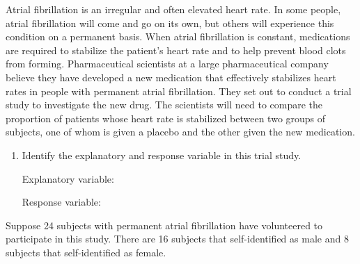 \documentclass[
]{report}
\begin{document}
Atrial fibrillation is an irregular and often elevated heart rate. In some people, atrial fibrillation will come and go on its own, but others will experience this condition on a permanent basis. When atrial fibrillation is constant, medications are required to stabilize the patient's heart rate and to help prevent blood clots from forming. Pharmaceutical scientists at a large pharmaceutical company believe they have developed a new medication that effectively stabilizes heart rates in people with permanent atrial fibrillation. They set out to conduct a trial study to investigate the new drug. The scientists will need to compare the proportion of patients whose heart rate is stabilized between two groups of subjects, one of whom is given a placebo and the other given the new medication.

\begin{enumerate}
\def\labelenumi{\arabic{enumi}.}
\item
  Identify the explanatory and response variable in this trial study.

  Explanatory variable:
  \vspace{0.5in}

  Response variable:
  \vspace{0.5in}
\end{enumerate}

\newpage

Suppose 24 subjects with permanent atrial fibrillation have volunteered to participate in this study. There are 16 subjects that self-identified as male and 8 subjects that self-identified as female.
\end{document}
